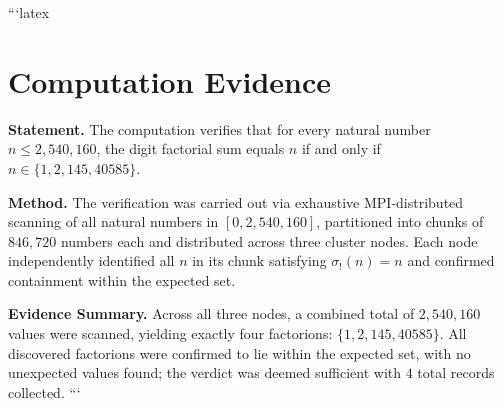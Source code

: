 ```latex
\section*{Computation Evidence}

\textbf{Statement.} The computation verifies that for every natural number $n \leq 2{,}540{,}160$, the digit factorial sum equals $n$ if and only if $n \in \{1, 2, 145, 40585\}$.

\textbf{Method.} The verification was carried out via exhaustive MPI-distributed scanning of all natural numbers in $[0, 2{,}540{,}160]$, partitioned into chunks of $846{,}720$ numbers each and distributed across three cluster nodes. Each node independently identified all $n$ in its chunk satisfying $\sigma_{!}(n) = n$ and confirmed containment within the expected set.

\textbf{Evidence Summary.} Across all three nodes, a combined total of $2{,}540{,}160$ values were scanned, yielding exactly four factorions: $\{1, 2, 145, 40585\}$. All discovered factorions were confirmed to lie within the expected set, with no unexpected values found; the verdict was deemed sufficient with $4$ total records collected.
```